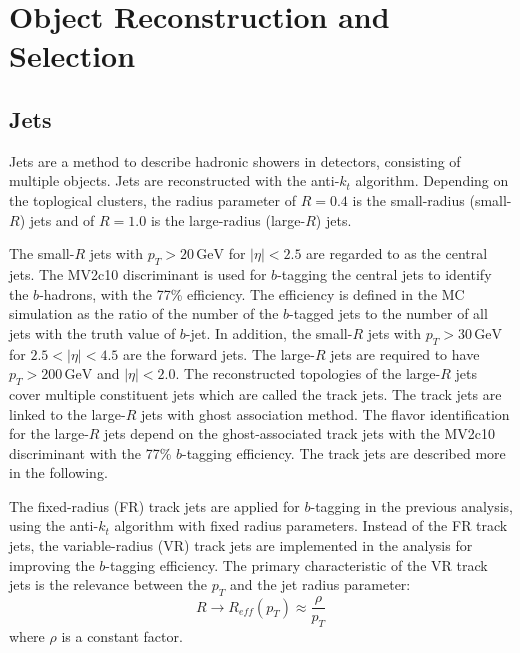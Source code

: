 \documentclass[class=NTHU_thesis, crop=false]{standalone}
\begin{document}
\chapter{Object Reconstruction and Selection}
\label{chap:object_reconstruction}
\section{Jets}
Jets are a method to describe hadronic showers in detectors, consisting of multiple objects. Jets are reconstructed with the anti-$k_t$ algorithm\cite{1126-6708-2008-04-063}. Depending on the toplogical clusters, the radius parameter of $R = 0.4$ is the small-radius (small-$R$) jets and of $R = 1.0$ is the large-radius (large-$R$) jets.

The small-$R$ jets with $p_T > 20\, \mathrm{GeV}$ for $\left|\eta\right| < 2.5$ are regarded to as the central jets. The MV2c10 discriminant\cite{ATL-PHYS-PUB-2015-022} is used for $b$-tagging the central jets to identify the $b$-hadrons, with the 77\% efficiency. The efficiency is defined in the MC simulation as the ratio of the number of the $b$-tagged jets to the number of all jets with the truth value of $b$-jet. In addition, the small-$R$ jets with $p_T > 30\, \mathrm{GeV}$ for $2.5 < \left|\eta\right| < 4.5$ are the forward jets. The large-$R$ jets are required to have $p_T > 200\, \mathrm{GeV}$ and $\left|\eta\right| < 2.0$. The reconstructed topologies of the large-$R$ jets cover multiple constituent jets which are called the track jets. The track jets are linked to the large-$R$ jets with ghost association method\cite{1126-6708-2008-04-005}\cite{CACCIARI2008119}. The flavor identification for the large-$R$ jets depend on the ghost-associated track jets with the MV2c10 discriminant with the 77\% $b$-tagging efficiency. The track jets are described more in the following.

The fixed-radius (FR) track jets are applied for $b$-tagging in the previous analysis, using the anti-$k_t$ algorithm with fixed radius parameters. Instead of the FR track jets, the variable-radius (VR) track jets\cite{0903.0392} are implemented in the analysis for improving the $b$-tagging efficiency. The primary characteristic of the VR track jets is the relevance between the $p_T$ and the jet radius parameter: 
\begin{equation}
R \to R_{eff}(p_T) \approx \frac{\rho}{p_T}
\end{equation}
where $\rho$ is a constant factor.
\end{document}

